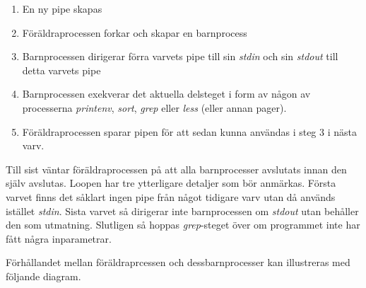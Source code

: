 \documentclass[10pt,a4paper]{article}
\begin{document}
\begin{enumerate}
\item En ny pipe skapas
\item Föräldraprocessen forkar och skapar en barnprocess
\item Barnprocessen dirigerar förra varvets pipe till sin \emph{stdin} och sin \emph{stdout} till detta varvets pipe
\item Barnprocessen exekverar det aktuella delsteget i form av någon av processerna \emph{printenv}, \emph{sort}, \emph{grep} eller \emph{less} (eller annan pager).
\item Föräldraprocessen sparar pipen för att sedan kunna användas i steg 3 i nästa varv.
\end{enumerate}

Till sist väntar föräldraprocessen på att alla barnprocesser avslutats innan den själv avslutas. Loopen har tre ytterligare detaljer som bör anmärkas. Första varvet finns det såklart ingen pipe från något tidigare varv utan då används istället \emph{stdin}. Sista varvet så dirigerar inte barnprocessen om \emph{stdout} utan behåller den som utmatning. Slutligen så hoppas \emph{grep}-steget över om programmet inte har fått några inparametrar.

Förhållandet mellan föräldraprcessen och dessbarnprocesser kan illustreras med följande diagram.

\end{document}
